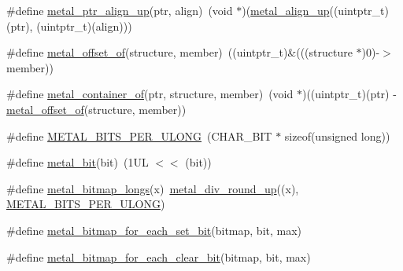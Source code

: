 \begin{DoxyCompactItemize}
\item 
\#define \hyperlink{group__utilities_ga4fe28bcda40d18f0ede123b6fb81abee}{metal\+\_\+ptr\+\_\+align\+\_\+up}(ptr,  align)~(void $\ast$)(\hyperlink{group__utilities_ga416a17445a84ce264d90616960082f51}{metal\+\_\+align\+\_\+up}((uintptr\+\_\+t)(ptr), (uintptr\+\_\+t)(align)))
\item 
\#define \hyperlink{group__utilities_gae60f3b54d150788936f856605ae97771}{metal\+\_\+offset\+\_\+of}(structure,  member)~((uintptr\+\_\+t)\&(((structure $\ast$)0)-\/$>$member))
\item 
\#define \hyperlink{group__utilities_ga641140abcd34001218982af331e559e1}{metal\+\_\+container\+\_\+of}(ptr,  structure,  member)~(void $\ast$)((uintptr\+\_\+t)(ptr) -\/ \hyperlink{group__utilities_gae60f3b54d150788936f856605ae97771}{metal\+\_\+offset\+\_\+of}(structure, member))
\item 
\#define \hyperlink{group__utilities_ga346994d9555206ff5b417774f1b1a81c}{M\+E\+T\+A\+L\+\_\+\+B\+I\+T\+S\+\_\+\+P\+E\+R\+\_\+\+U\+L\+O\+NG}~(C\+H\+A\+R\+\_\+\+B\+IT $\ast$ sizeof(unsigned long))
\item 
\#define \hyperlink{group__utilities_ga89b6d4d2f25b7cb7a1c96f3acb8f0bcb}{metal\+\_\+bit}(bit)~(1\+U\+L $<$$<$ (bit))
\item 
\#define \hyperlink{group__utilities_ga4cdd72506a6f9e69a772670fd159b5a4}{metal\+\_\+bitmap\+\_\+longs}(x)~\hyperlink{group__utilities_gace231318276c47f6e2fbc12e61fd5b7c}{metal\+\_\+div\+\_\+round\+\_\+up}((x), \hyperlink{group__utilities_ga346994d9555206ff5b417774f1b1a81c}{M\+E\+T\+A\+L\+\_\+\+B\+I\+T\+S\+\_\+\+P\+E\+R\+\_\+\+U\+L\+O\+NG})
\item 
\#define \hyperlink{group__utilities_gae9b3f29572249c108220c4b4aecf55a3}{metal\+\_\+bitmap\+\_\+for\+\_\+each\+\_\+set\+\_\+bit}(bitmap,  bit,  max)
\item 
\#define \hyperlink{group__utilities_gac301167f066509c8713f452bd05d70d3}{metal\+\_\+bitmap\+\_\+for\+\_\+each\+\_\+clear\+\_\+bit}(bitmap,  bit,  max)
\end{DoxyCompactItemize}
